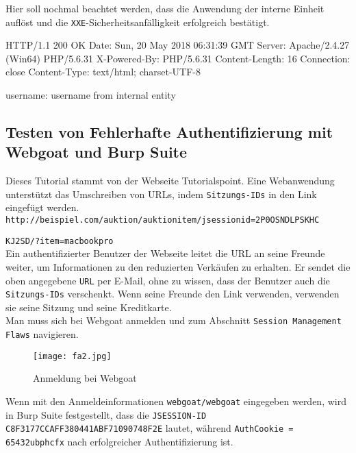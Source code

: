 Hier soll nochmal beachtet werden, dass die Anwendung der interne Einheit auflöst und die \texttt{XXE}-Sicherheitsanfälligkeit erfolgreich bestätigt.\\

\begin{LaTeXCode}[caption={Bestätigung der XXE-Schwachstelle},captionpos=b][numbers=none]
	HTTP/1.1 200 OK
	Date: Sun, 20 May 2018 06:31:39 GMT
	Server: Apache/2.4.27 (Win64) PHP/5.6.31
	X-Powered-By: PHP/5.6.31
	Content-Length: 16
	Connection: close
	Content-Type: text/html; charset-UTF-8	
	
	username: username from internal entity\\
\end{LaTeXCode}

\subsection{Testen von Fehlerhafte Authentifizierung mit Webgoat und Burp Suite}
Dieses Tutorial stammt von der Webseite Tutorialspoint\cite{tpfa15}.
Eine Webanwendung unterstützt das Umschreiben von URLs, indem \texttt{Sitzungs-IDs} in den Link eingefügt werden.\\

\texttt{http://beispiel.com/auktion/auktionitem/jsessionid=2P0OSNDLPSKHC}

\texttt{KJ2SD/?item=macbookpro}\\

Ein authentifizierter Benutzer der Webseite leitet die URL an seine Freunde weiter, um Informationen zu den reduzierten Verkäufen zu erhalten. Er sendet die oben angegebene \texttt{URL} per E-Mail, ohne zu wissen, dass der Benutzer auch die \texttt{Sitzungs-IDs} verschenkt. Wenn seine Freunde den Link verwenden, verwenden sie seine Sitzung und seine Kreditkarte.\\

Man muss sich bei Webgoat anmelden und zum Abschnitt \texttt{Session Management Flaws} navigieren.\\

\newpage

\begin{figure}[h]
	\centering
	\texttt{[image: fa2.jpg]}
	\caption{Anmeldung bei Webgoat}
\end{figure}

Wenn mit den Anmeldeinformationen \texttt{webgoat/webgoat} eingegeben werden, wird in Burp Suite festgestellt, dass die \texttt{JSESSION-ID C8F3177CCAFF380441ABF71090748F2E} lautet, während \texttt{AuthCookie = 65432ubphcfx} nach erfolgreicher Authentifizierung ist.

